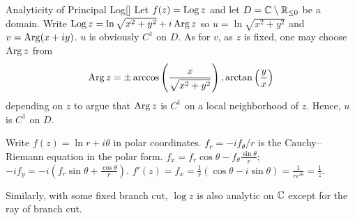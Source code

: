 \documentclass[../complex_variables_1.tex]{subfiles}
\begin{document}
\begin{Example}{Analyticity of Principal Log}[]
    Let \(f(z) = \operatorname{Log} z\) and let \(D = \CC \setminus \RR_{\le 0}\)
    be a domain.
    Write \(\operatorname{Log} z = \ln\sqrt{x^2+y^2} + i\operatorname{Arg} z\)
    so \(u = \ln\sqrt{x^2+y^2}\) and \(v = \operatorname{Arg}(x+iy)\). \(u\) is obviously \(C^1\) on \(D\).
    As for \(v\), as \(z\) is fixed, one may choose \(\operatorname{Arg} z\) from
    \[
        \operatorname{Arg} z = \pm\arccos\left(\frac{x}{\sqrt{x^2+y^2}}\right),
        \arctan\left(\frac{y}{x}\right)
    \]
    depending on \(z\) to argue that \(\operatorname{Arg} z\) is \(C^1\) on
    a local neighborhood of \(z\).
    Hence, \(u\) is \(C^1\) on \(D\).

    Write \(f(z) = \ln r + i\theta\) in polar coordinates.
    \(f_r = -if_\theta/r\) is the Cauchy--Riemann equation in the polar form.
    \(f_x = f_r \cos\theta - f_\theta \frac{\sin\theta}{r}\);
    \(-if_y = -i\left(f_r \sin\theta + \frac{\cos\theta}{r}\right)\).
    \(f'(z) = f_x = \frac{1}{r}(\cos\theta - i \sin\theta) = \frac{1}{re^{i\theta}} = \frac{1}{z}\).

    Similarly, with some fixed branch cut, \(\log z\) is also analytic on \(\CC\)
    except for the ray of branch cut.
\end{Example}
\end{document}
